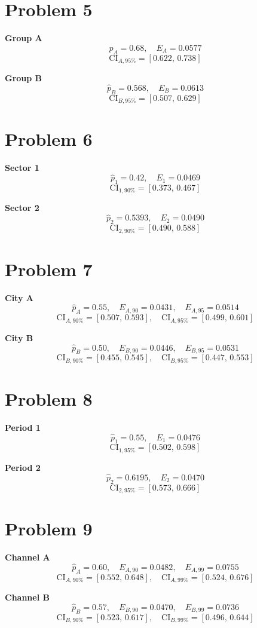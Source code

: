 	\section*{Problem 5}
	\textbf{Group A}
	\[
	\hat p_A=0.68,\quad E_A=0.0577
	\]
	\[
	\text{CI}_{A,95\%}=[0.622,\,0.738]
	\]
	
	\textbf{Group B}
	\[
	\hat p_B=0.568,\quad E_B=0.0613
	\]
	\[
	\text{CI}_{B,95\%}=[0.507,\,0.629]
	\]
	
	\section*{Problem 6}
	\textbf{Sector 1}
	\[
	\hat p_1=0.42,\quad E_1=0.0469
	\]
	\[
	\text{CI}_{1,90\%}=[0.373,\,0.467]
	\]
	
	\textbf{Sector 2}
	\[
	\hat p_2=0.5393,\quad E_2=0.0490
	\]
	\[
	\text{CI}_{2,90\%}=[0.490,\,0.588]
	\]
	
	\section*{Problem 7}
	\textbf{City A}
	\[
	\hat p_A=0.55,\quad E_{A,90}=0.0431,\quad E_{A,95}=0.0514
	\]
	\[
	\text{CI}_{A,90\%}=[0.507,\,0.593],\quad \text{CI}_{A,95\%}=[0.499,\,0.601]
	\]
	
	\textbf{City B}
	\[
	\hat p_B=0.50,\quad E_{B,90}=0.0446,\quad E_{B,95}=0.0531
	\]
	\[
	\text{CI}_{B,90\%}=[0.455,\,0.545],\quad \text{CI}_{B,95\%}=[0.447,\,0.553]
	\]
	
	\section*{Problem 8}
	\textbf{Period 1}
	\[
	\hat p_1=0.55,\quad E_1=0.0476
	\]
	\[
	\text{CI}_{1,95\%}=[0.502,\,0.598]
	\]
	
	\textbf{Period 2}
	\[
	\hat p_2=0.6195,\quad E_2=0.0470
	\]
	\[
	\text{CI}_{2,95\%}=[0.573,\,0.666]
	\]
	
	\section*{Problem 9}
	\textbf{Channel A}
	\[
	\hat p_A=0.60,\quad E_{A,90}=0.0482,\quad E_{A,99}=0.0755
	\]
	\[
	\text{CI}_{A,90\%}=[0.552,\,0.648],\quad \text{CI}_{A,99\%}=[0.524,\,0.676]
	\]
	
	\textbf{Channel B}
	\[
	\hat p_B=0.57,\quad E_{B,90}=0.0470,\quad E_{B,99}=0.0736
	\]
	\[
	\text{CI}_{B,90\%}=[0.523,\,0.617],\quad \text{CI}_{B,99\%}=[0.496,\,0.644]
	\]
	
